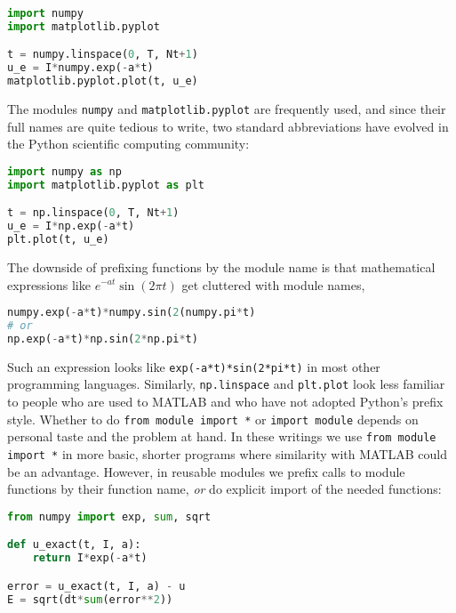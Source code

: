 \documentclass[graybox,sectrefs,envcountresetchap,open=right,final]{svmonodo}
\begin{document}
\begin{lstlisting}[language=Python,style=blue1_bluegreen]
import numpy
import matplotlib.pyplot

t = numpy.linspace(0, T, Nt+1)
u_e = I*numpy.exp(-a*t)
matplotlib.pyplot.plot(t, u_e)
\end{lstlisting}

The modules \texttt{numpy} and \texttt{matplotlib.pyplot} are frequently used,
and since their full names are quite tedious to write,
two standard abbreviations
have evolved in the Python scientific computing community:

\begin{lstlisting}[language=Python,style=blue1_bluegreen]
import numpy as np
import matplotlib.pyplot as plt

t = np.linspace(0, T, Nt+1)
u_e = I*np.exp(-a*t)
plt.plot(t, u_e)
\end{lstlisting}

The downside of prefixing functions by the module name is that
mathematical expressions like $e^{-at}\sin(2\pi t)$ get
cluttered with module names,
\begin{lstlisting}[language=Python,style=blue1_bluegreen]
numpy.exp(-a*t)*numpy.sin(2(numpy.pi*t)
# or
np.exp(-a*t)*np.sin(2*np.pi*t)
\end{lstlisting}
Such an expression looks like \texttt{exp(-a*t)*sin(2*pi*t)} in most other
programming languages. Similarly, \texttt{np.linspace} and \texttt{plt.plot} look
less familiar to people who are used to MATLAB and who have not
adopted Python's prefix style.  Whether to do \texttt{from module import *}
or \texttt{import module} depends on personal taste and the problem at
hand. In these writings we use \texttt{from module import *} in more basic,
shorter programs where similarity with MATLAB could be an
advantage. However, in reusable modules we prefix calls to module
functions by their function name, \emph{or} do explicit import of the
needed functions:

\begin{lstlisting}[language=Python,style=blue1_bluegreen]
from numpy import exp, sum, sqrt

def u_exact(t, I, a):
    return I*exp(-a*t)

error = u_exact(t, I, a) - u
E = sqrt(dt*sum(error**2))
\end{lstlisting}
\end{document}
